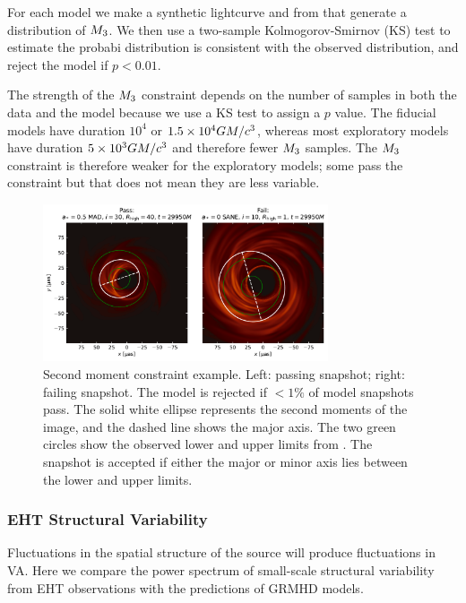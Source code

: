 For each model we make a synthetic lightcurve and from that generate a distribution of $M_{3}$.  We then use a two-sample Kolmogorov-Smirnov (KS) test to estimate the probabi distribution is consistent with the observed distribution, and reject the model if $p < 0.01$.

The strength of the $M_{3}$ constraint depends on the number of samples in both the data and the model because we use a KS test to assign a $p$ value.  The fiducial models have duration $10^4$ or $1.5\times 10^4 GM/c^3$, whereas most exploratory models have duration $5 \times 10^3 GM/c^3$ and therefore fewer $M_{3}$ samples. The $M_{3}$ constraint is therefore weaker for the exploratory models; some pass the constraint but that does not mean they are less variable.


\begin{figure}
  \centering
  \includegraphics[width=0.75\textwidth]{figures/passfail_sz.pdf}
  \caption{Second moment constraint example.  Left: passing snapshot; right: failing snapshot.  The model is rejected if $< 1\%$ of model snapshots pass. The solid white ellipse  represents the second moments of the image, and the dashed line shows the major axis.  The two green circles show the observed lower and upper limits from . The snapshot is accepted if either the major or minor axis lies between the lower and upper limits.
  }
  \label{fig:passfail_sz}
\end{figure}

\subsubsection{EHT Structural Variability}

Fluctuations in the spatial structure of the source will produce fluctuations in VA.  Here we compare  the power spectrum of small-scale structural variability from EHT observations with the predictions of GRMHD models.

